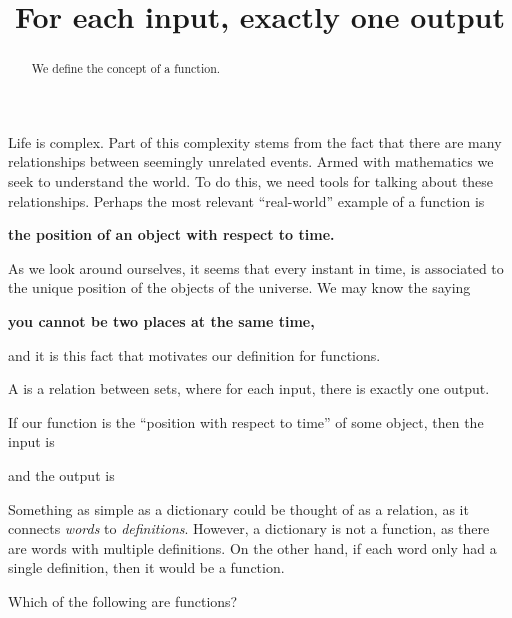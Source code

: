 \documentclass{ximera}
\title{For each input, exactly one output}
\begin{document}
\begin{abstract}
  We define the concept of a function.
\end{abstract}
\maketitle


Life is complex. Part of this complexity stems from the fact that
there are many relationships between seemingly unrelated events. Armed
with mathematics we seek to understand the world. To do this, we need
tools for talking about these relationships. Perhaps the most relevant
``real-world'' example of a function is
\begin{center}
  \textbf{the position of an object with respect to time.}
\end{center}
As we look around ourselves, it seems that every instant in time, is
associated to the unique position of the objects of the universe.  We
may know the saying
\begin{center}
  \textbf{you cannot be two places at the same time,}
\end{center}
and it is this fact that motivates our definition for functions.

\begin{definition}
A  is a relation between sets, where for each input,
there is exactly one output.
\end{definition}

\begin{question}
  If our function is the ``position with respect to time'' of some
  object, then the input is
  \begin{multipleChoice}
  \end{multipleChoice}
  and the output is
  \begin{multipleChoice}
  \end{multipleChoice}
\end{question}


Something as simple as a dictionary could be thought of as a relation,
as it connects \textit{words} to \textit{definitions}. However, a
dictionary is not a function, as there are words with multiple
definitions. On the other hand, if each word only had a single
definition, then it would be a function.

\begin{question}
  Which of the following are functions?
  \begin{selectAll}
  \end{selectAll}
\end{question}
\end{document}
